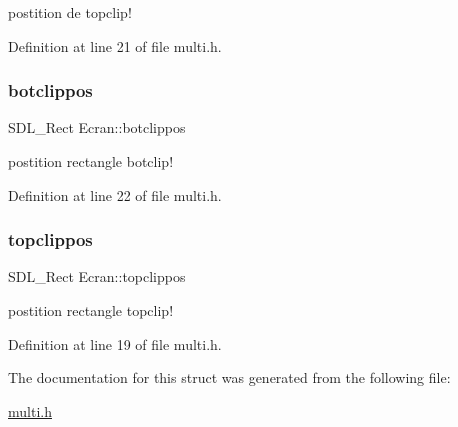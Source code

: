 postition de topclip! 

Definition at line 21 of file multi.\+h.

\mbox{\label{structEcran_ab08e2f16c938be034346c7267fad5cf1}} 
\subsubsection{\texorpdfstring{botclippos}{botclippos}}
{\footnotesize\ttfamily S\+D\+L\+\_\+\+Rect Ecran\+::botclippos}

postition rectangle botclip! 

Definition at line 22 of file multi.\+h.

\mbox{\label{structEcran_aea06b9168f992fa7e6a1bbb2dfcd11e3}} 
\subsubsection{\texorpdfstring{topclippos}{topclippos}}
{\footnotesize\ttfamily S\+D\+L\+\_\+\+Rect Ecran\+::topclippos}

postition rectangle topclip! 

Definition at line 19 of file multi.\+h.



The documentation for this struct was generated from the following file\+:\begin{DoxyCompactItemize}
\item 
\hyperlink{multi_8h}{multi.\+h}\end{DoxyCompactItemize}
